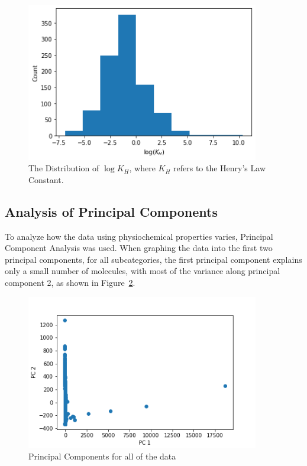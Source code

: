 \documentclass[12pt, oneside]{article}   	%
\begin{document}
\begin{figure}[h!] %
   \centering
   \includegraphics[width=4in]{data-dist.png} 
   \caption{The Distribution of $\log K_H$, where $K_H$ refers to the Henry's Law Constant.}
   \label{fig:dist}
\end{figure}

\newpage
\subsection{Analysis of Principal Components}
To analyze how the data using physiochemical properties varies, Principal Component Analysis was used. When graphing the data into the first two principal components, for all subcategories, the first principal component explains only a small number of molecules, with most of the variance along principal component 2, as shown in Figure~\ref{fig:pc1}.

\begin{figure}[!h] %
   \centering
   \includegraphics[width=4in]{PCA_all.png} 
   \caption{Principal Components for all of the data}
   \label{fig:pc1}
\end{figure}
\end{document}
